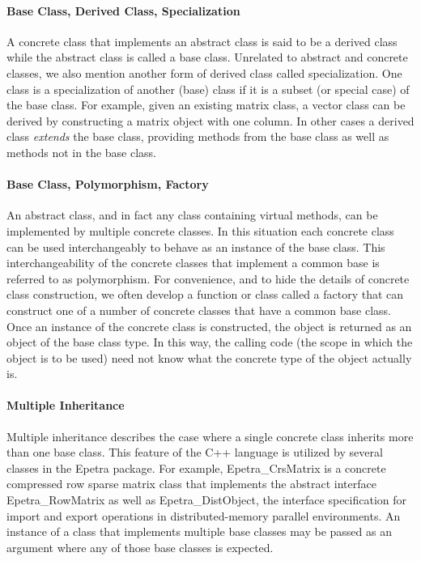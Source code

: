 \documentclass[12pt,relax]{TrilinosOverview}
\begin{document}
\paragraph{Base Class, Derived Class, Specialization} 
A concrete class that implements an abstract class is said to be a derived
class while the abstract class is called a base class.  Unrelated to abstract
and concrete classes, we also mention another form of derived class called
specialization.  One class is a specialization of another (base) class if it
is a subset (or special case) of the base class.  For example, given an
existing matrix class, a vector class can be derived by constructing a matrix
object with one column. In other cases a derived class {\it extends} the base
class, providing methods from the base class as well as methods not in the
base class.

\paragraph{Base Class, Polymorphism, Factory}
An abstract class, and in fact any class containing virtual methods, can be
implemented by multiple concrete classes.  In this situation each concrete
class can be used interchangeably to behave as an instance of the base class.
This interchangeability of the concrete classes that implement a common base
is referred to as polymorphism.  For convenience, and to hide the details of
concrete class construction, we often develop a function or class called a
factory that can construct one of a number of concrete classes that have a
common base class.  Once an instance of the concrete class is constructed, the
object is returned as an object of the base class type. In this way, the
calling code (the scope in which the object is to be used) need not know what
the concrete type of the object actually is.

\paragraph{Multiple Inheritance}
Multiple inheritance describes the case where a single concrete class inherits
more than one base class. This feature of the C++ language is utilized by
several classes in the Epetra package. For example, Epetra\_CrsMatrix is a
concrete compressed row sparse matrix class that implements the abstract
interface Epetra\_RowMatrix as well as Epetra\_DistObject, the interface
specification for import and export operations in distributed-memory parallel
environments. An instance of a class that implements multiple base classes may
be passed as an argument where any of those base classes is expected.
\end{document}
